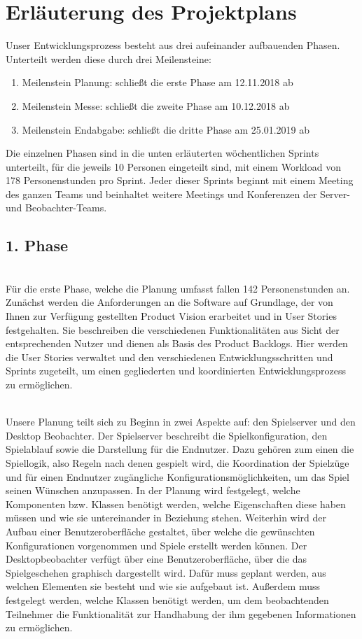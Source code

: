 \documentclass[11pt, a4paper]{article} %
\begin{document}
\setcounter{page}{3}
\section*{Erläuterung des Projektplans}

Unser Entwicklungsprozess besteht aus drei aufeinander aufbauenden Phasen. Unterteilt werden diese durch drei Meilensteine:
\begin{enumerate}
\item Meilenstein Planung: schließt die erste Phase am 12.11.2018 ab
\item Meilenstein Messe: schließt die zweite Phase am 10.12.2018 ab
\item Meilenstein Endabgabe: schließt die dritte Phase am 25.01.2019 ab
\end{enumerate}
Die einzelnen Phasen sind in die unten erläuterten wöchentlichen Sprints unterteilt, für die jeweils 10 Personen eingeteilt sind, mit einem Workload von 178 Personenstunden pro Sprint. Jeder dieser Sprints beginnt mit einem Meeting des ganzen Teams und beinhaltet weitere Meetings und Konferenzen der Server- und  Beobachter-Teams.\\

\subsection*{1. Phase}

\ \\Für die erste Phase, welche die Planung umfasst fallen 142 Personenstunden an. Zunächst werden die Anforderungen an die Software auf Grundlage, der von Ihnen zur Verfügung gestellten Product Vision erarbeitet und in User Stories festgehalten. Sie beschreiben die verschiedenen Funktionalitäten aus Sicht der entsprechenden Nutzer und dienen als Basis des Product Backlogs. Hier werden die User Stories verwaltet und den verschiedenen Entwicklungsschritten und Sprints zugeteilt, um einen gegliederten und koordinierten Entwicklungsprozess zu ermöglichen. 

\ \\Unsere Planung teilt sich zu Beginn in zwei Aspekte auf: den Spielserver und den Desktop Beobachter.
Der Spielserver beschreibt die Spielkonfiguration, den Spielablauf sowie die Darstellung für die Endnutzer. Dazu gehören zum einen die Spiellogik, also Regeln nach denen gespielt wird, die Koordination der Spielzüge und für einen Endnutzer zugängliche Konfigurationsmöglichkeiten, um das Spiel seinen Wünschen anzupassen. In der Planung wird festgelegt, welche Komponenten bzw. Klassen benötigt werden, welche Eigenschaften diese haben müssen und wie sie untereinander in Beziehung stehen. Weiterhin wird der Aufbau einer Benutzeroberfläche gestaltet, über welche die gewünschten Konfigurationen vorgenommen und Spiele erstellt werden können.
Der Desktopbeobachter verfügt über eine Benutzeroberfläche, über die das Spielgeschehen graphisch dargestellt wird. Dafür muss geplant werden, aus welchen Elementen sie besteht und wie sie aufgebaut ist. Außerdem muss festgelegt werden, welche Klassen benötigt werden, um dem beobachtenden Teilnehmer die Funktionalität zur Handhabung der ihm gegebenen Informationen zu ermöglichen. 
\end{document}
